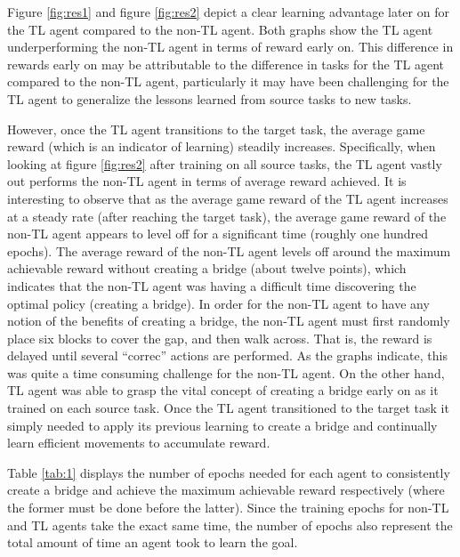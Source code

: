 \documentclass{llncs}
\begin{document}

Figure \ref{fig:res1} and figure \ref{fig:res2} depict a clear learning advantage later on for the TL agent compared to the non-TL agent. 
Both graphs show the TL agent underperforming the non-TL agent in terms of reward early on.
This difference in rewards early on may be attributable to the difference in tasks for the TL agent compared to the non-TL agent, particularly it may have been challenging for the TL agent to generalize the lessons learned from source tasks to new tasks.

However, once the TL agent transitions to the target task, the average game reward (which is an indicator of learning) steadily increases.
Specifically, when looking at figure \ref{fig:res2} after training on all source tasks, the TL agent vastly out performs the non-TL agent in terms of average reward achieved.
It is interesting to observe that as the average game reward of the TL agent increases at a steady rate (after reaching the target task), the average game reward of the non-TL agent appears to level off for a significant time (roughly one hundred epochs).
The average reward of the non-TL agent levels off around the maximum achievable reward without creating a bridge (about twelve points), which indicates that the non-TL agent was having a difficult time discovering the optimal policy (creating a bridge). 
In order for the non-TL agent to have any notion of the benefits of creating a bridge, the non-TL agent must first randomly place six blocks to cover the gap, and then walk across.
That is, the reward is delayed until several ``correc'' actions are performed. 
As the graphs indicate, this was quite a time consuming challenge for the non-TL agent. 
On the other hand, TL agent was able to grasp the vital concept of creating a bridge early on as it trained on each source task. 
Once the TL agent transitioned to the target task it simply needed to apply its previous learning to create a bridge and continually learn efficient movements to accumulate reward. 

Table \ref{tab:1} displays the number of epochs needed for each agent to consistently create a bridge and achieve the maximum achievable reward respectively (where the former must be done before the latter). 
Since the training epochs for non-TL and TL agents take the exact same time, the number of epochs also represent the total amount of time an agent took to learn the goal. 
\end{document}
